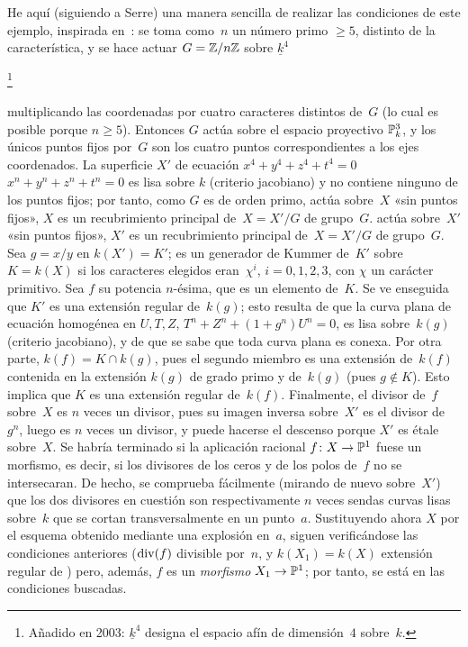 He aquí (siguiendo a Serre) una manera sencilla de realizar las condiciones
de este ejemplo, inspirada en~\cite[]{XI.5}: se toma como~$n$ un
número primo $\geq5$, distinto de la característica, y se hace actuar
$G=\mathbb Z/n\mathbb Z$ sobre $\underline{k}^4$%
{}
{{\renewcommand{\thefootnote}{*}\addtocounter{footnote}{-1}\kern1pt\footnote{\lcrochetbf Añadido en 2003: $\underline{k}^4$ designa el espacio afín de dimensión~$4$ sobre~$k$.\rcrochetbf}}}
multiplicando las coordenadas por cuatro caracteres distintos de~$G$ (lo
cual es posible porque $n\geq5$). Entonces $G$ actúa sobre el espacio
proyectivo $\mathbb P^3_k$, y los únicos puntos fijos por~$G$ son los cuatro
puntos correspondientes a los ejes coordenados. La superficie $X'$ de
ecuación
{$x^4+y^4+z^4+t^4=0$}
{$x^n+y^n+z^n+t^n=0$}
es lisa sobre
$k$ (criterio jacobiano) y no contiene ninguno de los puntos fijos; por
tanto, como $G$ es de orden primo,
{actúa sobre~$X$ «sin puntos fijos», \ie $X$ es un recubrimiento principal de~$X=X'/G$ de grupo~$G$.}
{actúa sobre~$X'$ «sin puntos fijos», \ie $X'$ es un recubrimiento principal de~$X=X'/G$ de grupo~$G$.}
Sea $g=x/y$ en $k(X')=K'$; es un generador de Kummer de~$K'$ sobre
$K=k(X)$ si los caracteres elegidos eran~$\chi^i$, $i=0,1,2,3$, con
$\chi$ un carácter primitivo. Sea $f$ su potencia $n$-ésima, que es un
elemento de~$K$. Se ve enseguida que $K'$ es una extensión regular
de~$k(g)$; esto resulta de que la curva plana de ecuación homogénea en
$U,T,Z$,
$T^n+Z^n+(1+g^n)U^n=0$, es lisa sobre~$k(g)$ (criterio jacobiano), y de que
se sabe que toda curva plana es conexa. Por otra parte,
$k(f)=K\cap k(g)$, pues el segundo miembro es una extensión de~$k(f)$
contenida en la extensión $k(g)$ de grado primo y
de~$k(g)$ (pues $g\not\in K$). Esto implica que $K$ es una extensión regular
de~$k(f)$. Finalmente, el divisor de~$f$ sobre~$X$ es $n$ veces un divisor,
pues su imagen inversa sobre~$X'$ es el divisor de~$g^n$, luego es $n$
veces un divisor, y puede hacerse el descenso porque $X'$ es étale
sobre~$X$. Se habría terminado si la aplicación racional
$f\colon X\to\mathbb P^1$ fuese un morfismo, es decir, si los divisores de los
ceros y de los polos de~$f$ no se intersecaran. De hecho, se comprueba
fácilmente (mirando de nuevo sobre~$X'$) que los dos divisores en cuestión
son respectivamente $n$ veces sendas curvas lisas sobre~$k$ que se cortan transversalmente en
un punto~$a$. Sustituyendo ahora $X$ por el esquema obtenido mediante una
explosión en~$a$, siguen verificándose las condiciones anteriores
($\operatorname{div}(f)$ divisible por~$n$, y $k(X_1)=k(X)$ extensión regular de
)
pero, además, $f$ es un \emph{morfismo} $X_1\to\mathbb P^1$; por tanto, se está
en las condiciones buscadas.
